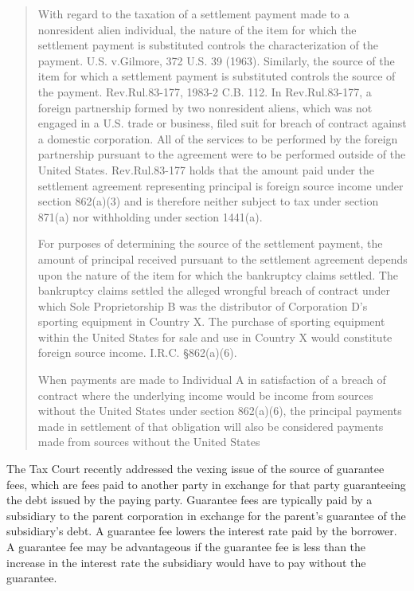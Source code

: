 	\begin{quote}
		With regard to the taxation of a settlement payment made to a nonresident alien individual, the nature of the item for which the settlement payment is substituted controls the characterization of the payment. U.S. v.\@ Gilmore, 372 U.S. 39 (1963). Similarly, the source of the item for which a settlement payment is substituted controls the source of the payment. Rev.\@\@ Rul.\@ 83-177, 1983-2 C.B. 112. In Rev.\@\@ Rul.\@ 83-177, a foreign partnership formed by two nonresident aliens, which was not engaged in a U.S. trade or business, filed suit for breach of contract against a domestic corporation. All of the services to be performed by the foreign partnership pursuant to the agreement were to be performed outside of the United States. Rev.\@\@ Rul.\@ 83-177 holds that the amount paid under the settlement agreement representing principal is foreign source income under section 862(a)(3) and is therefore neither subject to tax under section 871(a) nor withholding under section 1441(a).
		
		For purposes of determining the source of the settlement payment, the amount of principal received pursuant to the settlement agreement depends upon the nature of the item for which the bankruptcy claims settled. The bankruptcy claims settled the alleged wrongful breach of contract under which Sole Proprietorship B was the distributor of Corporation D's sporting equipment in Country X. The purchase of sporting equipment within the United States for sale and use in Country X would constitute foreign source income. I.R.C. \S 862(a)(6).

	When payments are made to Individual A in satisfaction of a breach of contract where the underlying income would be income from sources without the United States under section 862(a)(6), the principal payments made in settlement of that obligation will also be considered payments made from sources without the United States
		
		\end{quote}

The Tax Court recently addressed the vexing issue of the source of guarantee fees, which are fees paid to another party in exchange for that party guaranteeing the debt issued by the paying party.  Guarantee fees are typically paid by a subsidiary to the parent corporation in exchange for the parent's guarantee of the subsidiary's debt.  A guarantee fee lowers the interest rate paid by the borrower.  A guarantee fee may be advantageous if the guarantee fee is less than the increase in the interest rate the subsidiary would have to pay without the guarantee.

